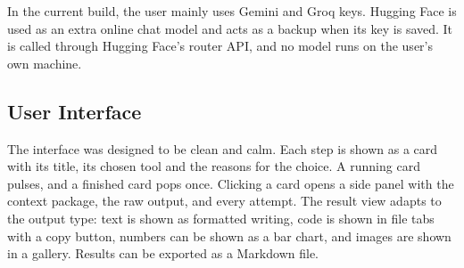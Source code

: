 \documentclass[conference]{IEEEtran}
\begin{document}
\begin{table}[htbp]
\caption{Tools in the Registry}
\begin{center}
\scriptsize
{}
\label{tab:tools}
\end{center}
\end{table}

In the current build, the user mainly uses Gemini and Groq keys. Hugging Face is used as an extra online
chat model and acts as a backup when its key is saved. It is called through Hugging Face's router API,
and no model runs on the user's own machine.

\subsection{User Interface}
The interface was designed to be clean and calm. Each step is shown as a card with its title, its chosen
tool and the reasons for the choice. A running card pulses, and a finished card pops once. Clicking a
card opens a side panel with the context package, the raw output, and every attempt. The result view
adapts to the output type: text is shown as formatted writing, code is shown in file tabs with a copy
button, numbers can be shown as a bar chart, and images are shown in a gallery. Results can be exported
as a Markdown file.
\end{document}

